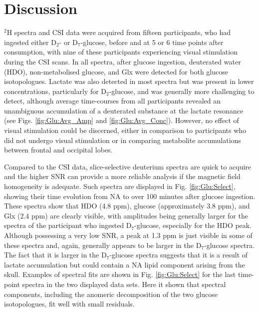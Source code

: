 \section{Discussion}

$^2$H spectra and \ac{CSI} data were acquired from fifteen participants, who had ingested either D$_2$- or D$_7$-glucose, before and at 5 or 6 time points after consumption, with nine of these participants experiencing visual stimulation during the \ac{CSI} scans. In all spectra, after glucose ingestion, deuterated water (\ac{HDO}), non-metabolised glucose, and Glx were detected for both glucose isotopologues. Lactate was also detected in most spectra but was present in lower concentrations, particularly for D$_2$-glucose, and was generally more challenging to detect, although average time-courses from all participants revealed an unambiguous accumulation of a deuterated substance at the lactate resonance (see Figs. \ref{fig:Glu:Avg_Amp} and \ref{fig:Glu:Avg_Conc}). However, no effect of visual stimulation could be discerned, either in comparison to participants who did not undergo visual stimulation or in comparing metabolite accumulations between frontal and occipital lobes.

 Compared to the \ac{CSI} data, slice-selective deuterium spectra are quick to acquire and the higher \ac{SNR} can provide a more reliable analysis if the magnetic field homogeneity is adequate. Such spectra are displayed in Fig. \ref{fig:Glu:Select}, showing their time evolution from \ac{NA} to over 100 minutes after glucose ingestion. These spectra show that HDO (4.8 ppm), glucose (approximately 3.8 ppm), and Glx (2.4 ppm) are clearly visible, with amplitudes being generally larger for the spectra of the participant who ingested D$_7$-glucose, especially for the \ac{HDO} peak. Although possessing a very low \ac{SNR}, a peak at 1.3 ppm is just visible in some of these spectra and, again, generally appears to be larger in the D$_7$-glucose spectra. The fact that it is larger in the D$_7$-glucose spectra suggests that it is a result of lactate accumulation but could contain a \ac{NA} lipid component arising from the skull. Examples of spectral fits are shown in Fig. \ref{fig:Glu:Select} for the last time-point spectra in the two displayed data sets. Here it shown that spectral components, including the anomeric decomposition of the two glucose isotopologues, fit well with small residuals.

